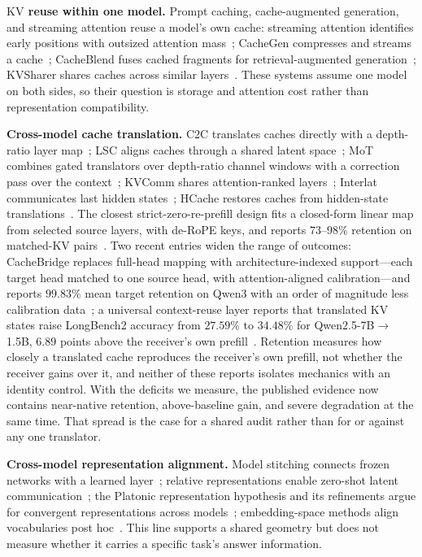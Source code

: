 \documentclass[10pt]{article}
\newcommand{\kv}{\ensuremath{\mathrm{KV}}}
\begin{document}
\textbf{\kv{} reuse within one model.} Prompt caching, cache-augmented
generation, and streaming attention reuse a model's own cache: streaming
attention identifies early positions with outsized attention
mass~\citep{streamingsink2023}; CacheGen compresses and streams a
cache~\citep{cachegen2024}; CacheBlend fuses cached fragments for
retrieval-augmented generation~\citep{cacheblend2025}; KVSharer shares caches
across similar layers~\citep{kvsharer2024}. These systems assume one model on
both sides, so their question is storage and attention cost rather than
representation compatibility.

\textbf{Cross-model cache translation.} C2C translates caches directly with a
depth-ratio layer map~\citep{c2c2025}; LSC aligns caches through a shared latent
space~\citep{lsc2026}; MoT combines gated translators over depth-ratio channel
windows with a correction pass over the context~\citep{mot2026}; KVComm shares
attention-ranked layers~\citep{kvcomm2025}; Interlat communicates last hidden
states~\citep{interlat2025}; HCache restores caches from hidden-state
translations~\citep{hcache2025}. The closest strict-zero-re-prefill design fits
a closed-form linear map from selected source layers, with de-RoPE keys, and
reports $73$--$98\%$ retention on matched-\kv{} pairs~\citep{heo2026}.
Two recent entries widen the range of outcomes: CacheBridge replaces full-head
mapping with architecture-indexed support---each target head matched to one
source head, with attention-aligned calibration---and reports $99.83\%$ mean
target retention on Qwen3 with an order of magnitude less calibration
data~\citep{cachebridge2026}; a universal context-reuse layer reports that
translated \kv{} states raise LongBench2 accuracy from $27.59\%$ to $34.48\%$
for Qwen2.5-7B$\to$1.5B, $6.89$ points above the receiver's own
prefill~\citep{contextreuse2026}. Retention measures how closely a translated
cache reproduces the receiver's own prefill, not whether the receiver gains over
it, and neither of these reports isolates mechanics with an identity control.
With the deficits we measure, the published evidence now contains near-native
retention, above-baseline gain, and severe degradation at the same time. That
spread is the case for a shared audit rather than for or against any one
translator.

\textbf{Cross-model representation alignment.} Model stitching connects frozen
networks with a learned layer~\citep{stitching2021}; relative representations
enable zero-shot latent communication~\citep{relrep2022}; the Platonic
representation hypothesis and its refinements argue for convergent
representations across models~\citep{platonic2024,perfectplatonic2025,aristotelian2026};
embedding-space methods align vocabularies post hoc~\citep{vec2vec2025}. This
line supports a shared geometry but does not measure whether it carries a
specific task's answer information.
\end{document}
